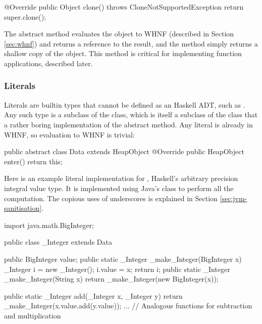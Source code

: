 \documentclass[dissertation.tex]{subfiles}
\begin{document}
{{\begin{javafigure}
{            @Override
            public Object clone() throws CloneNotSupportedException {
                return super.clone();
            }
        }
        \end{javafigure}

        The abstract  method evaluates the object to WHNF (described in Section \ref{sec:whnf}) and returns a reference to the result, and the  method simply returns a shallow copy of the object. This method is critical for implementing function applications, described later.

        \subsubsection{Literals}\label{sec:literals}
        {
            Literals are builtin types that cannot be defined as an Haskell ADT, such as . Any such type is a subclass of the  class, which is itself a subclass of the  class that a rather boring implementation of the abstract  method. Any literal is already in WHNF, so evaluation to WHNF is trivial:

            \begin{javafigure}
            public abstract class Data extends HeapObject {
                @Override
                public HeapObject enter() {
                    return this;
                }
            }
            \end{javafigure}

            Here is an example literal implementation for , Haskell's arbitrary precision integral value type. It is implemented using Java's  class to perform all the computation. The copious uses of underscores is explained in Section \ref{sec:jvm-sanitisation}.

            \begin{javafigure}
            import java.math.BigInteger;

            public class _Integer extends Data {
                public BigInteger value;
                public static _Integer _make_Integer(BigInteger x) {
                    _Integer i = new _Integer();
                    i.value = x;
                    return i;
                }
                public static _Integer _make_Integer(String x) {
                    return _make_Integer(new BigInteger(x));
                }

                public static _Integer add(_Integer x, _Integer y) {
                    return _make_Integer(x.value.add(y.value));
                }
                ... // Analogous functions for subtraction and multiplication

}
\end{javafigure}}}}
\end{document}
